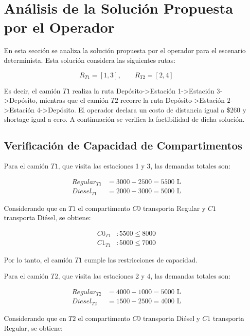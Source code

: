 \section{Análisis de la Solución Propuesta por el Operador}

En esta sección se analiza la solución propuesta por el operador para el escenario determinista. Esta solución considera las siguientes rutas:

\begin{equation*}
R_{T1} = [1,3], \qquad R_{T2} = [2,4]
\end{equation*}

Es decir, el camión $T1$ realiza la ruta Depósito->Estación 1->Estación 3->Depósito, mientras que el camión $T2$ recorre la ruta Depósito->Estación 2->Estación 4->Depósito. El operador declara un costo de distancia igual a \$260 y shortage igual a cero. A continuación se verifica la factibilidad de dicha solución.

\subsection{Verificación de Capacidad de Compartimentos}

Para el camión $T1$, que visita las estaciones 1 y 3, las demandas totales son:

\begin{align*}
Regular_{T1} &= 3000 + 2500 = 5500 \text{ L} \\
Diesel_{T1} &= 2000 + 3000 = 5000 \text{ L}
\end{align*}

Considerando que en $T1$ el compartimento $C0$ transporta Regular y $C1$ transporta Diésel, se obtiene:

\begin{align*}
C0_{T1} &: 5500 \leq 8000 \\
C1_{T1} &: 5000 \leq 7000
\end{align*}

Por lo tanto, el camión $T1$ cumple las restricciones de capacidad.

Para el camión $T2$, que visita las estaciones 2 y 4, las demandas totales son:

\begin{align*}
Regular_{T2} &= 4000 + 1000 = 5000 \text{ L} \\
Diesel_{T2} &= 1500 + 2500 = 4000 \text{ L}
\end{align*}

Considerando que en $T2$ el compartimento $C0$ transporta Diésel y $C1$ transporta Regular, se obtiene:

